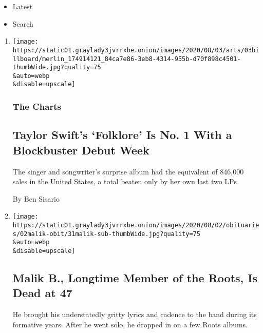 \begin{itemize}
\tightlist
\item
  \protect\hyperlink{stream-panel}{Latest}
\item
  Search
\end{itemize}

\begin{enumerate}
\def\labelenumi{\arabic{enumi}.}
\item
  \href{/2020/08/03/arts/music/taylor-swift-folklore-billboard-chart.html}{}

  \texttt{[image: https://static01.graylady3jvrrxbe.onion/images/2020/08/03/arts/03billboard/merlin\_174914121\_84ca7e86-3eb8-4314-955b-d70f898c4501-thumbWide.jpg?quality=75\\\&auto=webp\\\&disable=upscale]}

  \hypertarget{the-charts}{%
  \subsubsection{The Charts}\label{the-charts}}

  \hypertarget{taylor-swifts-folklore-is-no-1-with-a-blockbuster-debut-week}{%
  \subsection{Taylor Swift's `Folklore' Is No. 1 With a Blockbuster
  Debut
  Week}\label{taylor-swifts-folklore-is-no-1-with-a-blockbuster-debut-week}}

  The singer and songwriter's surprise album had the equivalent of
  846,000 sales in the United States, a total beaten only by her own
  last two LPs.

  By Ben Sisario
\item
  \href{/2020/07/31/arts/music/malik-b-dead.html}{}

  \texttt{[image: https://static01.graylady3jvrrxbe.onion/images/2020/08/02/obituaries/02malik-obit/31malik-sub-thumbWide.jpg?quality=75\\\&auto=webp\\\&disable=upscale]}

  \hypertarget{malik-b-longtime-member-of-the-roots-is-dead-at-47}{%
  \subsection{Malik B., Longtime Member of the Roots, Is Dead at
  47}\label{malik-b-longtime-member-of-the-roots-is-dead-at-47}}

  He brought his understatedly gritty lyrics and cadence to the band
  during its formative years. After he went solo, he dropped in on a few
  Roots albums.


\end{enumerate}
